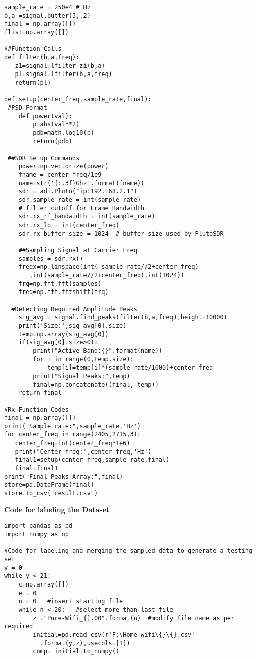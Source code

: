 \begin{appendices}
\begin{verbatim}
sample_rate = 250e4 # Hz
b,a =signal.butter(3,.2)
final = np.array([])
flist=np.array([])
 
##Function Calls
def filter(b,a,freq):
   z1=signal.lfilter_zi(b,a)
   pl=signal.lfilter(b,a,freq)
   return(pl)
 
def setup(center_freq,sample_rate,final):
 #PSD_Format
    def power(val):
    	p=abs(val**2)
    	pdb=math.log10(p)
    	return(pdb)

 ##SDR Setup Commands
    power=np.vectorize(power)
    fname = center_freq/1e9
    name=str('{:.3f}Ghz'.format(fname))
    sdr = adi.Pluto("ip:192.168.2.1")
    sdr.sample_rate = int(sample_rate)
    # filter cutoff for Frame Bandwidth
    sdr.rx_rf_bandwidth = int(sample_rate) 
    sdr.rx_lo = int(center_freq)
    sdr.rx_buffer_size = 1024  # buffer size used by PlutoSDR
    
    ##Sampling Signal at Carrier Freq
    samples = sdr.rx()
    freqx=np.linspace(int(-sample_rate//2+center_freq)
       ,int(sample_rate//2+center_freq),int(1024))
    frq=np.fft.fft(samples)
    freq=np.fft.fftshift(frq)

  #Detecting Required Amplitude Peaks
    sig_avg = signal.find_peaks(filter(b,a,freq),height=10000)
    print('Size:',sig_avg[0].size)
    temp=np.array(sig_avg[0])
    if(sig_avg[0].size>0):
        print("Active Band:{}".format(name))
        for i in range(0,temp.size):
            temp[i]=temp[i]*(sample_rate/1000)+center_freq
        print("Signal Peaks:",temp)
        final=np.concatenate((final, temp))
    return final
 
#Rx Function Codes
final = np.array([])
print("Sample rate:",sample_rate,'Hz')
for center_freq in range(2405,2715,3):
   center_freq=int(center_freq*1e6)
   print("Center_freq:",center_freq,'Hz')
   final1=setup(center_freq,sample_rate,final)
   final=final1
print("Final Peaks_Array:",final)
store=pd.DataFrame(final)    
store.to_csv("result.csv")
  \end{verbatim}

  \textbf{Code for labeling the Dataset}
  \begin{verbatim}
import pandas as pd
import numpy as np

#Code for labeling and merging the sampled data to generate a testing set
y = 0
while y < 21:
    c=np.array([])
    e = 0
    n = 0 	#insert starting file
    while n < 20: 	#select more than last file
        z ="Pure-Wifi_{}.00".format(n)  #modify file name as per required
        initial=pd.read_csv(r'F:\Home-wifi\{}\{}.csv'
          .format(y,z),usecols=[1])
        comp= initial.to_numpy()


\end{verbatim}
\end{appendices}
